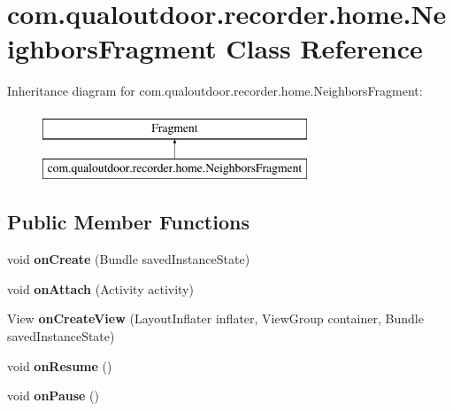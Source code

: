 \hypertarget{classcom_1_1qualoutdoor_1_1recorder_1_1home_1_1NeighborsFragment}{\section{com.\-qualoutdoor.\-recorder.\-home.\-Neighbors\-Fragment Class Reference}
\label{classcom_1_1qualoutdoor_1_1recorder_1_1home_1_1NeighborsFragment}
}
Inheritance diagram for com.\-qualoutdoor.\-recorder.\-home.\-Neighbors\-Fragment\-:\begin{figure}[H]
\begin{center}
\leavevmode
\includegraphics[height=2.000000cm]{classcom_1_1qualoutdoor_1_1recorder_1_1home_1_1NeighborsFragment}
\end{center}
\end{figure}
\subsection*{Public Member Functions}
\begin{DoxyCompactItemize}
\item 
\hypertarget{classcom_1_1qualoutdoor_1_1recorder_1_1home_1_1NeighborsFragment_a1d70fdaf72715d2f15540fb51c5a3098}{void {\bfseries on\-Create} (Bundle saved\-Instance\-State)}\label{classcom_1_1qualoutdoor_1_1recorder_1_1home_1_1NeighborsFragment_a1d70fdaf72715d2f15540fb51c5a3098}

\item 
\hypertarget{classcom_1_1qualoutdoor_1_1recorder_1_1home_1_1NeighborsFragment_a1752be071736a0bee812b46335902313}{void {\bfseries on\-Attach} (Activity activity)}\label{classcom_1_1qualoutdoor_1_1recorder_1_1home_1_1NeighborsFragment_a1752be071736a0bee812b46335902313}

\item 
\hypertarget{classcom_1_1qualoutdoor_1_1recorder_1_1home_1_1NeighborsFragment_a6e3019be203bdf8f257a5355b9359dbf}{View {\bfseries on\-Create\-View} (Layout\-Inflater inflater, View\-Group container, Bundle saved\-Instance\-State)}\label{classcom_1_1qualoutdoor_1_1recorder_1_1home_1_1NeighborsFragment_a6e3019be203bdf8f257a5355b9359dbf}

\item 
\hypertarget{classcom_1_1qualoutdoor_1_1recorder_1_1home_1_1NeighborsFragment_a36e48fe916ae5d1d26c0fdd5d6a67ab3}{void {\bfseries on\-Resume} ()}\label{classcom_1_1qualoutdoor_1_1recorder_1_1home_1_1NeighborsFragment_a36e48fe916ae5d1d26c0fdd5d6a67ab3}

\item 
\hypertarget{classcom_1_1qualoutdoor_1_1recorder_1_1home_1_1NeighborsFragment_ac21f7aa25cecfb1c940aae046ffe10a7}{void {\bfseries on\-Pause} ()}\label{classcom_1_1qualoutdoor_1_1recorder_1_1home_1_1NeighborsFragment_ac21f7aa25cecfb1c940aae046ffe10a7}

\end{DoxyCompactItemize}
